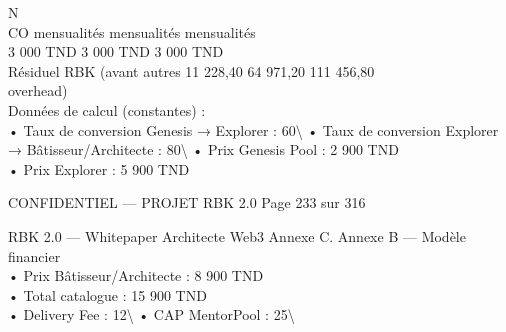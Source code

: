\documentclass[12pt,landscape,a4paper]{article}
\newenvironment{confidential}
{\begin{tcolorbox}[
    colback=rbkred!5!white,
    colframe=rbkred!75!black,
    title=CONFIDENTIEL,
    fonttitle=\bfseries\color{white},
    coltitle=rbkred!75!black,
    breakable,
    enhanced,
    frame hidden,
    borderline west={2pt}{0pt}{rbkred!75!black}
]}
{\end{tcolorbox}}
\begin{document}
\vspace{0.5em}
\vspace{0.5em}
\vspace{0.5em}
N\\
CO                  mensualités       mensualités   mensualités\\
3 000 TND         3 000 TND     3 000 TND\\
Résiduel RBK (avant autres        11 228,40         64 971,20     111 456,80\\
overhead)\\
\vspace{0.5em}
\vspace{0.5em}
\vspace{0.5em}
Données de calcul (constantes) :\\
\vspace{0.5em}
• Taux de conversion Genesis → Explorer : 60\textbackslash{}%
\vspace{0.5em}
• Taux de conversion Explorer → Bâtisseur/Architecte : 80\textbackslash{}%
\vspace{0.5em}
• Prix Genesis Pool : 2 900 TND\\
\vspace{0.5em}
• Prix Explorer : 5 900 TND\\
\vspace{0.5em}
\vspace{0.5em}
\begin{confidential}CONFIDENTIEL — PROJET RBK 2.0                                          Page 233 sur 316\end{confidential}
RBK 2.0 — Whitepaper Architecte Web3                                                                                    Annexe C. Annexe B — Modèle financier\\
\vspace{0.5em}
\vspace{0.5em}
• Prix Bâtisseur/Architecte : 8 900 TND\\
\vspace{0.5em}
• Total catalogue : 15 900 TND\\
\vspace{0.5em}
• Delivery Fee : 12\textbackslash{}%
\vspace{0.5em}
• CAP MentorPool : 25\textbackslash{}%
\vspace{0.5em}
\end{document}
